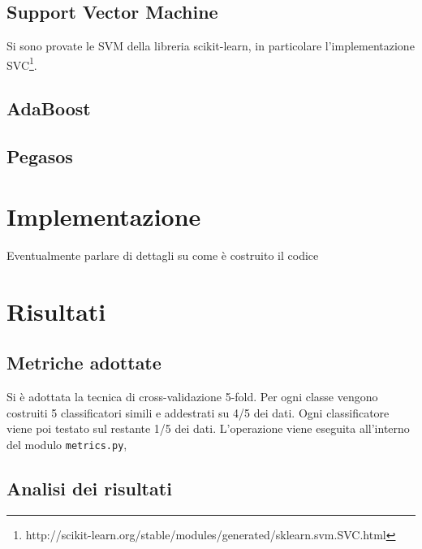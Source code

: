 \documentclass[12pt,a4paper,oneside,hidelinks]{report}
\begin{document}
\section{Support Vector Machine}
Si sono provate le SVM della libreria scikit-learn, in particolare l'implementazione SVC\footnote{http://scikit-learn.org/stable/modules/generated/sklearn.svm.SVC.html}.
\section{AdaBoost}
\section{Pegasos}

\chapter{Implementazione}
Eventualmente parlare di dettagli su come è costruito il codice
\chapter{Risultati}
\section{Metriche adottate}
Si è adottata la tecnica di cross-validazione 5-fold. Per ogni classe vengono costruiti 5 classificatori simili e addestrati su 4/5 dei dati. Ogni classificatore viene poi testato sul restante 1/5 dei dati.
L'operazione viene eseguita all'interno del modulo \texttt{metrics.py}, 
\section{Analisi dei risultati}
\end{document}
